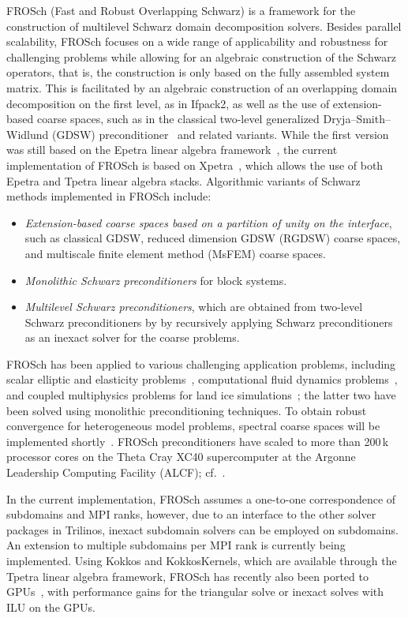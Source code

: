 FROSch (Fast and Robust Overlapping Schwarz) is a framework for the construction of multilevel Schwarz domain decomposition solvers. Besides parallel scalability, FROSch focuses on a wide range of applicability and robustness for challenging problems while allowing for an algebraic construction of the Schwarz operators, that is, the construction is only based on the fully assembled system matrix. This is facilitated by an algebraic construction of an overlapping domain decomposition on the first level, as in Ifpack2, as well as the use of extension-based coarse spaces, such as in the classical two-level generalized Dryja--Smith--Widlund (GDSW) preconditioner~\cite{dohrmann_domain_2008} and related variants. While the first version was still based on the Epetra linear algebra framework~\cite{heinlein_parallel_2016}, the current implementation of FROSch is based on Xpetra~\cite{heinlein_frosch_2020}, which allows the use of both Epetra and Tpetra linear algebra stacks. Algorithmic variants of Schwarz methods implemented in FROSch include:
\begin{itemize}
	\item \emph{Extension-based coarse spaces based on a partition of unity on the interface}, such as classical GDSW, reduced dimension GDSW (RGDSW) coarse spaces, and multiscale finite element method (MsFEM) coarse spaces.
	\item \emph{Monolithic Schwarz preconditioners} for block systems.
	\item \emph{Multilevel Schwarz preconditioners}, which are obtained from two-level Schwarz preconditioners by by recursively applying Schwarz preconditioners as an inexact solver for the coarse problems.
\end{itemize}
FROSch has been applied to various challenging application problems, including scalar elliptic and elasticity problems~\cite{heinlein_parallel_2016}, computational fluid dynamics problems~\cite{heinlein_monolithic_2019}, and coupled multiphysics problems for land ice simulations~\cite{heinlein_frosch_2022}; the latter two have been solved using monolithic preconditioning techniques. To obtain robust convergence for heterogeneous model problems, spectral coarse spaces will be implemented shortly~\cite{heinlein_adaptive_2019}. FROSch preconditioners have scaled to more than 200\,k processor cores on the Theta Cray XC40 supercomputer at the Argonne Leadership Computing Facility (ALCF); cf.~\cite{heinlein_parallel_2022}.

In the current implementation, FROSch assumes a one-to-one correspondence of subdomains and MPI ranks, however, due to an interface to the other solver packages in Trilinos, inexact subdomain solvers can be employed on subdomains. An extension to multiple subdomains per MPI rank is currently being implemented. Using Kokkos and KokkosKernels, which are available through the Tpetra linear algebra framework, FROSch has recently also been ported to GPUs~\cite{Yamazaki:2022:EST}, with performance gains for the triangular solve or inexact solves with ILU on the GPUs.

